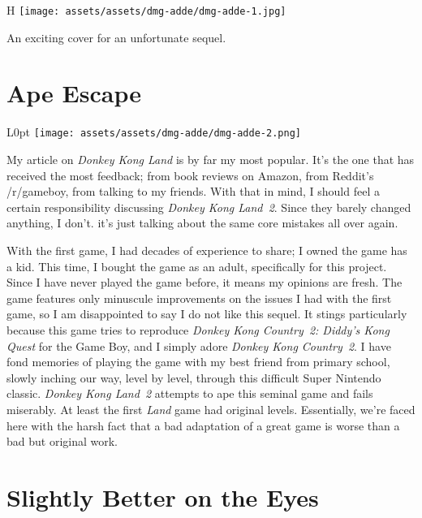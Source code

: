 \documentclass{book}
\begin{document}
\begin{wrapfigure}{H}{\linewidth}
\vskip 4pt
\centering \texttt{[image: assets/assets/dmg-adde/dmg-adde-1.jpg]}\par\pagetwodescription An exciting cover for an unfortunate sequel.\end{wrapfigure}
\clearpage

\FloatBarrier\needspace{10mm}\section*{Ape Escape}\nopagebreak[4]

\begin{wrapfigure}{L}{0pt} \texttt{[image: assets/assets/dmg-adde/dmg-adde-2.png]}\end{wrapfigure}

My article on \emph{Donkey Kong Land} is by far my most popular. It’s the one that has received the most feedback; from book reviews on Amazon, from Reddit’s /r/gameboy, from talking to my friends. With that in mind, I should feel a certain responsibility discussing \emph{Donkey Kong Land 2}. Since they barely changed anything, I don’t. it’s just talking about the same core mistakes all over again.

With the first game, I had decades of experience to share; I owned the game has a kid. This time, I bought the game as an adult, specifically for this project. Since I have never played the game before, it means my opinions are fresh. The game features only minuscule improvements on the issues I had with the first game, so I am disappointed to say I do not like this sequel. It stings particularly because this game tries to reproduce \emph{Donkey Kong Country 2: Diddy’s Kong Quest} for the Game Boy, and I simply adore \emph{Donkey Kong Country 2}. I have fond memories of playing the game with my best friend from primary school, slowly inching our way, level by level, through this difficult Super Nintendo classic. \emph{Donkey Kong Land 2} attempts to ape this seminal game and fails miserably. At least the first \emph{Land} game had original levels. Essentially, we’re faced here with the harsh fact that a bad adaptation of a great game is worse than a bad but original work.

\FloatBarrier\needspace{10mm}\section*{Slightly Better on the Eyes}\nopagebreak[4]
\end{document}
